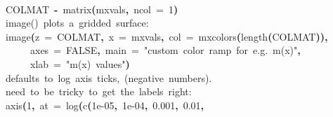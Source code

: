 \documentclass[a4paper]{article}
\newcommand{\hlnumber}[1]{\textcolor[rgb]{0.0823529411764706,0.0784313725490196,0.709803921568627}{#1}}%
\newcommand{\hlfunctioncall}[1]{\textcolor[rgb]{1,0,0}{#1}}%
\newcommand{\hlstring}[1]{\textcolor[rgb]{0.6,0.6,1}{#1}}%
\newcommand{\hlkeyword}[1]{\textcolor[rgb]{0,0,0}{\textbf{#1}}}%
\newcommand{\hlargument}[1]{\textcolor[rgb]{0.694117647058824,0.247058823529412,0.0196078431372549}{#1}}%
\newcommand{\hlcomment}[1]{\textcolor[rgb]{0.8,0.8,0.8}{#1}}%
\newcommand{\hlassignement}[1]{\textcolor[rgb]{0.215686274509804,0.215686274509804,0.384313725490196}{\textbf{#1}}}%
\newcommand{\hlsymbol}[1]{\textcolor[rgb]{0,0,0}{#1}}%
\newcommand{\hlprompt}[1]{\textcolor[rgb]{0,0,0}{#1}}%
\newcommand{\hlstd}[1]{\textcolor[rgb]{0,0,0}{#1}}%
\newenvironment{Houtput}{\raggedright}{%
%
}
\begin{document}
\begin{Houtput}
\normalfont
\hspace*{\fill}\\
\hlstd{}\ttfamily\noindent
\hlprompt{\usebox{\hlnormalsizeboxgreaterthan}{\ }}\hlsymbol{COLMAT}{\ }\hlassignement{\usebox{\hlnormalsizeboxlessthan}-}{\ }\hlfunctioncall{matrix}\hlkeyword{(}\hlsymbol{mxvals}\hlkeyword{,}{\ }\hlargument{ncol}{\ }\hlargument{=}{\ }\hlnumber{1}\hlkeyword{)}\mbox{}
\normalfont
\hspace*{\fill}\\
\hlstd{}\ttfamily\noindent
\hlprompt{\usebox{\hlnormalsizeboxgreaterthan}{\ }}\hlcomment{\usebox{\hlnormalsizeboxhash}{\ }image(){\ }plots{\ }a{\ }gridded{\ }surface:}\mbox{}
\normalfont
\hspace*{\fill}\\
\hlstd{}\ttfamily\noindent
\hlprompt{\usebox{\hlnormalsizeboxgreaterthan}{\ }}\hlfunctioncall{image}\hlkeyword{(}\hlargument{z}{\ }\hlargument{=}{\ }\hlsymbol{COLMAT}\hlkeyword{,}{\ }\hlargument{x}{\ }\hlargument{=}{\ }\hlsymbol{mxvals}\hlkeyword{,}{\ }\hlargument{col}{\ }\hlargument{=}{\ }\hlfunctioncall{mxcolors}\hlkeyword{(}\hlfunctioncall{length}\hlkeyword{(}\hlsymbol{COLMAT}\hlkeyword{)}\hlkeyword{)}\hlkeyword{,}\hspace*{\fill}\\
\hlstd{}\hlprompt{{\ }}{\ }{\ }{\ }{\ }\hlargument{axes}{\ }\hlargument{=}{\ }\hlnumber{FALSE}\hlkeyword{,}{\ }\hlargument{main}{\ }\hlargument{=}{\ }\hlstring{"custom{\ }color{\ }ramp{\ }for{\ }e.g.{\ }m(x)"}\hlkeyword{,}\hspace*{\fill}\\
\hlstd{}\hlprompt{{\ }}{\ }{\ }{\ }{\ }\hlargument{xlab}{\ }\hlargument{=}{\ }\hlstring{"m(x){\ }values"}\hlkeyword{)}\mbox{}
\normalfont
\hspace*{\fill}\\
\hlstd{}\ttfamily\noindent
\hlprompt{\usebox{\hlnormalsizeboxgreaterthan}{\ }}\hlcomment{\usebox{\hlnormalsizeboxhash}{\ }defaults{\ }to{\ }log{\ }axis{\ }ticks,{\ }(negative{\ }numbers).}\mbox{}
\normalfont
\hspace*{\fill}\\
\hlstd{}\ttfamily\noindent
\hlprompt{\usebox{\hlnormalsizeboxgreaterthan}{\ }}\hlcomment{\usebox{\hlnormalsizeboxhash}{\ }need{\ }to{\ }be{\ }tricky{\ }to{\ }get{\ }the{\ }labels{\ }right:}\mbox{}
\normalfont
\hspace*{\fill}\\
\hlstd{}\ttfamily\noindent
\hlprompt{\usebox{\hlnormalsizeboxgreaterthan}{\ }}\hlfunctioncall{axis}\hlkeyword{(}\hlnumber{1}\hlkeyword{,}{\ }\hlargument{at}{\ }\hlargument{=}{\ }\hlfunctioncall{log}\hlkeyword{(}\hlfunctioncall{c}\hlkeyword{(}\hlnumber{1e-05}\hlkeyword{,}{\ }\hlnumber{1e-04}\hlkeyword{,}{\ }\hlnumber{0.001}\hlkeyword{,}{\ }\hlnumber{0.01}\hlkeyword{,}\hspace*{\fill}\\

\end{Houtput}
\end{document}

